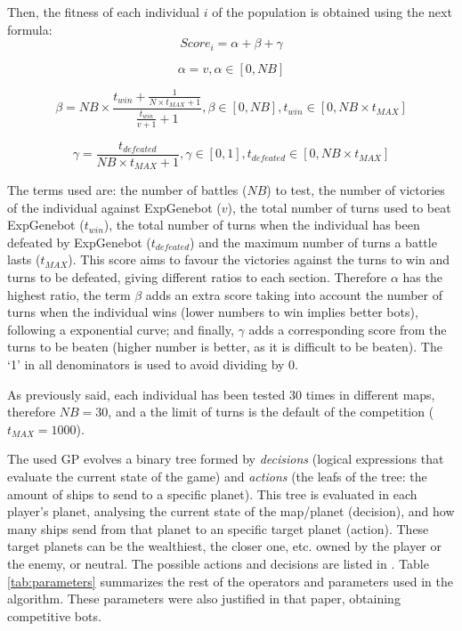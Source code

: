 \documentclass[runningheads,a4paper]{llncs}
\begin{document}
Then, the fitness of each individual $i$ of the population is obtained using the next formula:
\begin{equation}
Score_{i}=\alpha+\beta+\gamma\label{eq:score}
\end{equation}

\begin{equation}
\alpha=v,\alpha\in\left[0,NB\right]
\end{equation}

\begin{equation}
\beta=NB\times\frac{t_{win}+\frac{1}{N\times t_{MAX}+1}}{\frac{t_{win}}{v+1}+1},\beta\in\left[0,NB\right],t_{win}\in\left[0,NB\times t_{MAX}\right]
\end{equation}


\begin{equation}
\gamma=\frac{t_{defeated}}{NB\times t_{MAX}+1},\gamma\in\left[0,1\right],t_{defeated}\in\left[0,NB\times t_{MAX}\right]
\end{equation}

The terms used are: the number of battles ($NB$) to test, the number of
victories of the individual against ExpGenebot ($v$), the total number of
turns used to beat ExpGenebot ($t_{win}$), the total number of turns when
the individual has been defeated by ExpGenebot ($t_{defeated}$) and the
maximum number of turns a battle lasts ($t_{MAX}$). This score aims to
favour the victories against the turns to win and turns to be
defeated, giving different ratios to each section. 
Therefore $\alpha$ has the highest ratio, the term $\beta$ adds an extra score taking into account the number of turns when the individual wins (lower numbers to win implies better bots), following a exponential curve; and finally, $\gamma$ adds a corresponding score from the turns to be beaten 
(higher number is better, as it is difficult to be beaten). The 
`1' in all denominators is used to avoid dividing by 0.

As previously said, each individual has been tested 30 times in different maps, therefore $NB=30$, and a the limit of turns is the default of the competition ($t_{MAX}=1000$).

The used GP evolves a binary tree formed by {\em decisions} (logical expressions that evaluate the current state of the game) and {\em actions} (the leafs of the tree: the amount of ships to send to a specific planet). This tree is evaluated in each player's planet, analysing the current state of the map/planet (decision), and how many ships send from that planet to an specific target planet (action). These target planets can be the wealthiest, the closer one, etc. owned by the player or the enemy, or neutral. The possible actions and decisions are listed in \cite{EvoStar2014:GPBot:anon}. Table \ref{tab:parameters} summarizes the rest of the operators and parameters used in the algorithm. These parameters were also justified in that paper, obtaining competitive bots.
\end{document}

